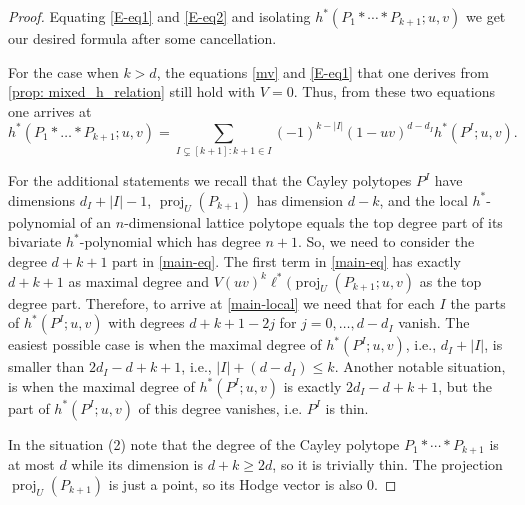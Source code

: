\documentclass[10pt,a4paper]{amsart}
\newcommand{\abs}[1]{\left| #1 \right|}
\DeclareMathOperator{\proj}{proj}
\begin{document}
\begin{proof}
Equating \eqref{E-eq1} and \eqref{E-eq2} and isolating $h^*(P_1 * \cdots *  P_{k+1};u,v)$ we get our desired formula after some cancellation. 

For the case when $k>d$, the equations  \eqref{mv} and  \eqref{E-eq1} that one derives 
from \cref{prop: mixed_h_relation} still hold with $V=0$. Thus, from these two equations one arrives  at 
\[ h^*(P_1 * \ldots * P_{k+1};u,v) =\sum_{I \subsetneq[k+1]: k+1 \in I} (-1)^{k -\abs{I}} (1-uv)^{d-d_I} h^*(P^I; u,v). \] 



For the additional statements we recall that the Cayley polytopes $P^I$ have dimensions $d_I+|I|-1$, $\proj_U(P_{k+1})$ has dimension $d-k$, and the local $h^*$-polynomial of an $n$-dimensional lattice polytope equals the top degree part of its bivariate $h^*$-polynomial which has degree $n+1$. So, we need to consider the degree $d+k+1$ part in \eqref{main-eq}.
The first term in \eqref{main-eq} has exactly $d+k+1$ as maximal degree and $ V (u v)^k \ell^*(\proj_U(P_{k+1};u,v)$ as the top degree part. Therefore, to arrive at \eqref{main-local} we need that for each $I$ the parts of $h^*(P^I;u,v)$  with degrees $d+k+1-2j$ for $j=0,\ldots, d-d_I$ vanish. 
The easiest possible case is when the maximal degree of $h^*(P^I;u,v)$, i.e., $d_I+\abs{I}$, is smaller than $2d_I-d+k+1$, i.e., $|I|+(d-d_I) \le k$. 
Another notable situation, is when the maximal degree of $h^*(P^I;u,v)$ is exactly  $2d_I-d+k+1$, but the part of $h^*(P^I;u,v)$ of this degree vanishes, i.e. $P^I$ is thin.  

In the situation (2) note that the degree of the Cayley polytope $P_1 * \cdots *  P_{k+1}$ is at most $d$ while its dimension is $d+k\ge 2d$, so it is trivially thin. The projection $\proj_U(P_{k+1})$ is just a point, so its Hodge vector is also $0$. 


\end{proof}
\end{document}
